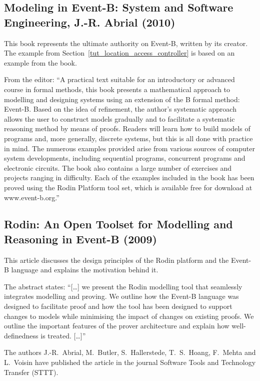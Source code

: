 \documentclass[12pt]{book}
\begin{document}
\subsection{Modeling in Event-B: System and Software Engineering, J.-R. Abrial (2010)}
\label{abrial_2010}

This book represents the ultimate authority on Event-B, written by its creator.  The example from Section~\ref{tut_location_access_controller} is based on an example from the book.

From the editor: ``A practical text suitable for an introductory or advanced course in formal methods, this book presents a mathematical approach to modelling and designing systems using an extension of the B formal method: Event-B. Based on the idea of refinement, the author's systematic approach allows the user to construct models gradually and to facilitate a systematic reasoning method by means of proofs. Readers will learn how to build models of programs and, more generally, discrete systems, but this is all done with practice in mind. The numerous examples provided arise from various sources of computer system developments, including sequential programs, concurrent programs and electronic circuits. The book also contains a large number of exercises and projects ranging in difficulty. Each of the examples included in the book has been proved using the Rodin Platform tool set, which is available free for download at www.event-b.org.''

\subsection{Rodin: An Open Toolset for Modelling and Reasoning in Event-B (2009)}
\label{abrialBHHMV_2009}

This article discusses the design principles of the Rodin platform and the Event-B language and 
explains the motivation behind it.

The abstract states: ``[\ldots] we present the Rodin modelling tool that seamlessly integrates modelling and proving. 
 We outline how the Event-B language was designed to facilitate proof and how the tool has been designed to support changes to 
 models while minimising the impact of changes on existing proofs. 
 We outline the important features of the prover architecture and explain how well-definedness is treated. [\ldots]''

The authors J.-R.~Abrial, M.~Butler, S.~Hallerstede, T.~S.~Hoang, F.~Mehta and L.~Voisin have published the article in the journal Software Tools and Technology Transfer (STTT).
\end{document}
